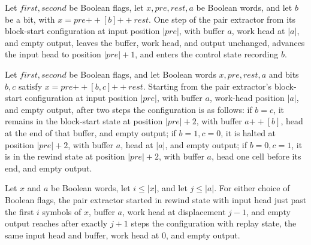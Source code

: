 \begin{lemma}
\label{Turing.FinTM.extract_first}
\leanok
{}
Let $first,second$ be Boolean flags, let $x,pre,rest,a$ be Boolean words, and let $b$ be
a bit, with $x=pre\mathbin{++}[b]\mathbin{++}rest$. One step of the pair extractor from
its block-start configuration at input position $|pre|$, with buffer $a$, work head at
$|a|$, and empty output, leaves the buffer, work head, and output unchanged, advances
the input head to position $|pre|+1$, and enters the control state recording $b$.
\end{lemma}

\begin{lemma}
\label{Turing.FinTM.extract_block}
\leanok
{}
Let $first,second$ be Boolean flags, and let Boolean words $x,pre,rest,a$ and bits $b,c$
satisfy $x=pre\mathbin{++}[b,c]\mathbin{++}rest$. Starting from the pair extractor's
block-start configuration at input position $|pre|$, with buffer $a$, work-head position
$|a|$, and empty output, after two steps the configuration is as follows: if $b=c$, it
remains in the block-start state at position $|pre|+2$, with buffer $a\mathbin{++}[b]$,
head at the end of that buffer, and empty output; if $b=1,c=0$, it is halted at position
$|pre|+2$, with buffer $a$, head at $|a|$, and empty output; if $b=0,c=1$, it is in the
rewind state at position $|pre|+2$, with buffer $a$, head one cell before its end, and
empty output.
\end{lemma}

\begin{lemma}
\label{Turing.FinTM.extract_rewind}
\leanok
{}
Let $x$ and $a$ be Boolean words, let $i \le |x|$, and let $j \le |a|$. For either
choice of Boolean flags, the pair extractor started in rewind state with input head just
past the first $i$ symbols of $x$, buffer $a$, work head at displacement $j-1$, and
empty output reaches after exactly $j+1$ steps the configuration with replay state, the
same input head and buffer, work head at $0$, and empty output.
\end{lemma}

